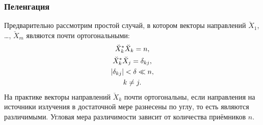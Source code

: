 \subsubsection{Пеленгация}

Предварительно рассмотрим простой случай, в котором векторы направлений $\breve{X}_1$, \dots, $\breve{X}_m$ являются почти ортогональными:
\begin{gather*}
    \breve{X}_k^* \breve{X}_k = n, \\
    \breve{X}_k^* \breve{X}_j = \delta_{kj}, \\
    \left | \delta_{kj} \right | < \delta \ll n, \\
    k \neq j .
\end{gather*}
На практике векторы направлений $\breve{X}_k$ почти ортогональны, если направления на источники излучения в достаточной мере разнесены по углу, то есть являются
различимыми. Угловая мера различимости зависит от количества приёмников $n$.

